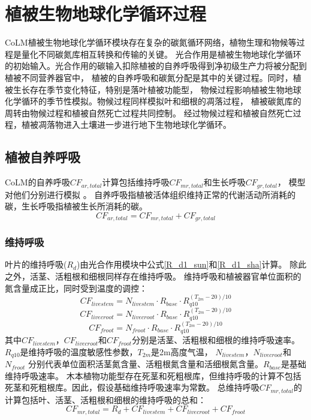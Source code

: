 \chapter{植被生物地球化学循环过程}\label{植被生物地球化学循环过程}

CoLM植被生物地球化学循环模块存在复杂的碳氮循环网络，植物生理和物候等过程是量化不同碳氮库相互转换和传输的关键。
光合作用是植被生物地球化学循环的初始输入。光合作用的碳输入扣除植被的自养呼吸得到净初级生产力将被分配到植被不同营养器官中，
植被的自养呼吸和碳氮分配是其中的关键过程。同时，植被生长存在季节变化特征，特别是落叶植被功能型，
物候过程影响植被生物地球化学循环的季节性模拟。物候过程同样模拟叶和细根的凋落过程，
植被碳氮库的周转由物候过程和植被自然死亡过程共同控制。
经过物候过程和植被自然死亡过程，植被凋落物进入土壤进一步进行地下生物地球化学循环。
\section{植被自养呼吸}\label{植被自养呼吸}
CoLM的自养呼吸$CF_{ar,total}$计算包括维持呼吸$CF_{mr,total}$和生长呼吸$CF_{gr,total}$，
模型对他们分别进行模拟 \citep{lavigne1997growth,sprugel1995respiration}。
自养呼吸指植被活体组织维持正常的代谢活动所消耗的碳，生长呼吸指植被生长所消耗的碳。
\begin{equation}
CF_{ar,total}=CF_{mr, total}+CF_{gr,total}
\end{equation}
\subsection{维持呼吸}
叶片的维持呼吸($R_d$)由光合作用模块中公式\eqref{R_d1_sun}和\eqref{R_d1_sha}计算。
除此之外，活茎、活粗根和细根同样存在维持呼吸。
维持呼吸和植被器官单位面积的氮含量成正比，同时受到温度的调控：
\begin{equation}
CF_{{livestem}}=N_{{livestem }} \cdot R_{{base }} \cdot R_{q10}^{\left(T_{2m}-20\right) / 10}
\end{equation}
\begin{equation}
CF_{ {livecroot }}=N_{ {livecroot }} \cdot R_{ {base }} \cdot R_{q10}^{\left(T_{2m}-20\right) / 10}
\end{equation}
\begin{equation}
CF_{ {froot }}=N_{{froot}} \cdot R_{{base}} \cdot R_{q10}^{\left(T_{2m}-20\right) / 10}
\end{equation}
其中$CF_{livestem}$，$CF_{livecroot}$和$CF_{froot}$分别是活茎、活粗根和细根的维持呼吸速率。
$R_{q10}$是维持呼吸的温度敏感性参数，$T_{2m}$是2m高度气温， $N_{livestem}$，$N_{livecroot}$和$N_{froot}$
分别代表单位面积活茎氮含量、活粗根氮含量和活细根氮含量。$R_{base}$是基础维持呼吸速率。
木本植物功能型存在死茎和死粗根库，但维持呼吸的计算不包括死茎和死粗根库。因此，假设基础维持呼吸速率为常数。
总维持呼吸$CF_{mr,total}$的计算包括叶、活茎、活粗根和细根的维持呼吸的总和：
\begin{equation}
CF_{mr,total}=R_{d}+CF_{livestem}+CF_{livecroot}+CF_{froot}
\end{equation}

